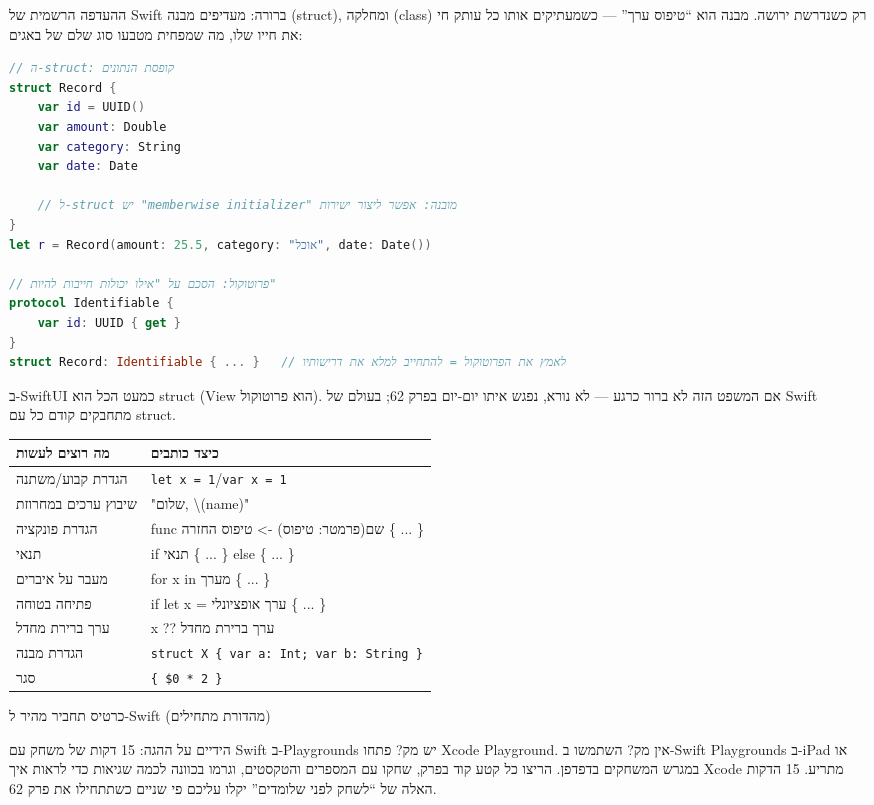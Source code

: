 
ההעדפה הרשמית של Swift ברורה: מעדיפים מבנה (struct), ומחלקה (class) רק כשנדרשת ירושה. מבנה הוא “טיפוס ערך” — כשמעתיקים אותו כל עותק חי את חייו שלו, מה שמפחית מטבעו סוג שלם של באגים:

\begin{lstlisting}[language=Swift]
// ה-struct: קופסת הנתונים
struct Record {
    var id = UUID()
    var amount: Double
    var category: String
    var date: Date

    // ל-struct יש "memberwise initializer" מובנה: אפשר ליצור ישירות
}
let r = Record(amount: 25.5, category: "אוכל", date: Date())

// פרוטוקול: הסכם על "אילו יכולות חייבות להיות"
protocol Identifiable {
    var id: UUID { get }
}
struct Record: Identifiable { ... }   // לאמץ את הפרוטוקול = להתחייב למלא את דרישותיו
\end{lstlisting}

ב-SwiftUI כמעט הכל הוא struct (View הוא פרוטוקול). אם המשפט הזה לא ברור כרגע — לא נורא, נפגש איתו יום-יום בפרק 62; בעולם של Swift מתחבקים קודם כל עם struct.


\begin{center}
\begin{tabularx}{\linewidth}{|X|X|}
\hline
\textbf{מה רוצים לעשות} & \textbf{כיצד כותבים} \tabularnewline
\hline
הגדרת קבוע/משתנה & \texttt{let x = 1}/\texttt{var x = 1} \tabularnewline
שיבוץ ערכים במחרוזת & "שלום, \textbackslash{}(name)" \tabularnewline
הגדרת פונקציה & func שם(פרמטר: טיפוס) -> טיפוס החזרה \{ ... \} \tabularnewline
תנאי & if תנאי \{ ... \} else \{ ... \} \tabularnewline
מעבר על איברים & for x in מערך \{ ... \} \tabularnewline
פתיחה בטוחה & if let x = ערך אופציונלי \{ ... \} \tabularnewline
ערך ברירת מחדל & x ?? ערך ברירת מחדל \tabularnewline
הגדרת מבנה & \texttt{struct X \{ var a: Int; var b: String \}} \tabularnewline
סגר & \texttt{\{ \$0 * 2 \}} \tabularnewline
\hline
\end{tabularx}
\end{center}

\begin{center}\small\color{gray}כרטיס תחביר מהיר ל-Swift (מהדורת מתחילים)\end{center}

\begin{tcbpractice}{הידיים על ההגה: 15 דקות של משחק עם Swift ב-Playgrounds}
יש מק? פתחו Xcode Playground. אין מק? השתמשו ב-Swift Playgrounds ב-iPad או במגרש המשחקים בדפדפן. הריצו כל קטע קוד בפרק, שחקו עם המספרים והטקסטים, וגרמו בכוונה לכמה שגיאות כדי לראות איך Xcode מתריע. 15 הדקות האלה של “לשחק לפני שלומדים” יקלו עליכם פי שניים כשתתחילו את פרק 62.

\end{tcbpractice}


